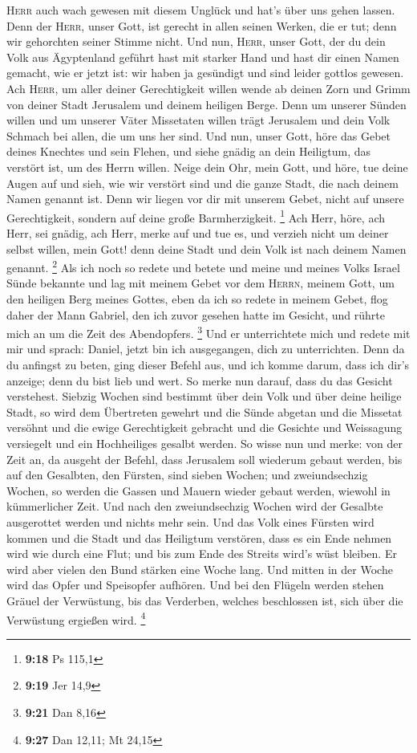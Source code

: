 \textsc{Herr} auch wach gewesen mit diesem Unglück und hat's über uns
gehen lassen. Denn der \textsc{Herr}, unser Gott, ist gerecht in allen
seinen Werken, die er tut; denn wir gehorchten seiner Stimme nicht.
 Und nun, \textsc{Herr}, unser Gott, der du dein Volk aus
Ägyptenland geführt hast mit starker Hand und hast dir einen Namen
gemacht, wie er jetzt ist: wir haben ja gesündigt und sind leider
gottlos gewesen.  Ach \textsc{Herr}, um aller deiner
Gerechtigkeit willen wende ab deinen Zorn und Grimm von deiner Stadt
Jerusalem und deinem heiligen Berge. Denn um unserer Sünden willen und
um unserer Väter Missetaten willen trägt Jerusalem und dein Volk Schmach
bei allen, die um uns her sind.  Und nun, unser Gott,
höre das Gebet deines Knechtes und sein Flehen, und siehe gnädig an dein
Heiligtum, das verstört ist, um des Herrn willen.  Neige
dein Ohr, mein Gott, und höre, tue deine Augen auf und sieh, wie wir
verstört sind und die ganze Stadt, die nach deinem Namen genannt ist.
Denn wir liegen vor dir mit unserem Gebet, nicht auf unsere
Gerechtigkeit, sondern auf deine große Barmherzigkeit. \footnote{\textbf{9:18}
  Ps 115,1}  Ach Herr, höre, ach Herr, sei gnädig, ach
Herr, merke auf und tue es, und verzieh nicht um deiner selbst willen,
mein Gott! denn deine Stadt und dein Volk ist nach deinem Namen genannt.
\footnote{\textbf{9:19} Jer 14,9}  Als ich noch so redete
und betete und meine und meines Volks Israel Sünde bekannte und lag mit
meinem Gebet vor dem \textsc{Herrn}, meinem Gott, um den heiligen Berg
meines Gottes,  eben da ich so redete in meinem Gebet,
flog daher der Mann Gabriel, den ich zuvor gesehen hatte im Gesicht, und
rührte mich an um die Zeit des Abendopfers. \footnote{\textbf{9:21} Dan
  8,16}  Und er unterrichtete mich und redete mit mir und
sprach: Daniel, jetzt bin ich ausgegangen, dich zu unterrichten.
 Denn da du anfingst zu beten, ging dieser Befehl aus,
und ich komme darum, dass ich dir's anzeige; denn du bist lieb und wert.
So merke nun darauf, dass du das Gesicht verstehest. 
Siebzig Wochen sind bestimmt über dein Volk und über deine heilige
Stadt, so wird dem Übertreten gewehrt und die Sünde abgetan und die
Missetat versöhnt und die ewige Gerechtigkeit gebracht und die Gesichte
und Weissagung versiegelt und ein Hochheiliges gesalbt werden.
 So wisse nun und merke: von der Zeit an, da ausgeht der
Befehl, dass Jerusalem soll wiederum gebaut werden, bis auf den
Gesalbten, den Fürsten, sind sieben Wochen; und zweiundsechzig Wochen,
so werden die Gassen und Mauern wieder gebaut werden, wiewohl in
kümmerlicher Zeit.  Und nach den zweiundsechzig Wochen
wird der Gesalbte ausgerottet werden und nichts mehr sein. Und das Volk
eines Fürsten wird kommen und die Stadt und das Heiligtum verstören,
dass es ein Ende nehmen wird wie durch eine Flut; und bis zum Ende des
Streits wird's wüst bleiben.  Er wird aber vielen den
Bund stärken eine Woche lang. Und mitten in der Woche wird das Opfer und
Speisopfer aufhören. Und bei den Flügeln werden stehen Gräuel der
Verwüstung, bis das Verderben, welches beschlossen ist, sich über die
Verwüstung ergießen wird. \footnote{\textbf{9:27} Dan 12,11; Mt 24,15}

